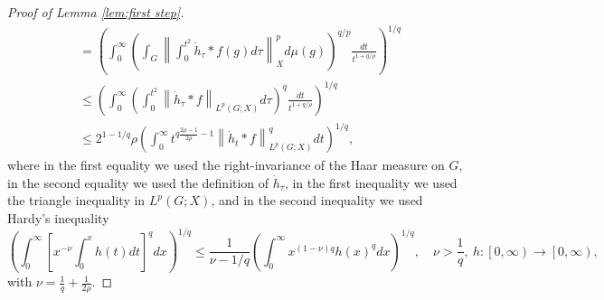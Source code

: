 \documentclass[11pt,reqno]{amsart}
\newcommand{\1}{\mathbf 1}
\begin{document}
\begin{proof}[Proof of Lemma \ref{lem:first step}]
\begin{align*}
&= \left(\int_0^\infty \left(\int_{G}\left\|\int_0^{t^2} \dot{h}_\tau *f\left(g\right)d\tau\right\|_{X}^pd\mu\left(g\right)\right)^{q/p} \frac{dt}{t^{1+q/\rho}}\right)^{1/q}\\
&\le \left(\int_0^\infty \left(\int_0^{t^2} \left\|\dot{h}_\tau*f\right\|_{L^p\left(G;X\right)} d\tau\right)^q\frac{dt}{t^{1+q/\rho}}\right)^{1/q}
\\
&\le 2^{1-1/q}\rho\left(\int_0^\infty t^{q\frac{2\rho-1}{2\rho}-1}\left\|\dot{h}_t*f\right\|_{L^p\left(G;X\right)}^qdt\right)^{1/q},
\end{align*}
where in the first equality we used the right-invariance of the Haar measure on $G$, in the second equality we used the definition of $\dot{h}_\tau$, in the first inequality we used the triangle inequality in $L^p\left(G;X\right)$, and in the second inequality we used Hardy's inequality \cite[Theorem 330]{hardy1952inequalities}
\begin{equation}\label{Hardy}
\left(\int_0^\infty \left[x^{-\nu}\int_0^x h\left(t\right)dt\right]^q dx\right)^{1/q}\le \frac{1}{\nu-1/q}\left(\int_0^\infty x^{\left(1-\nu\right)q}h\left(x\right)^q dx\right)^{1/q},\quad \nu> \frac 1q,~h:\left[0,\infty\right)\to \left[0,\infty\right),
\end{equation}
with $\nu=\frac 1q+\frac{1}{2\rho}$.


\end{proof}
\end{document}
